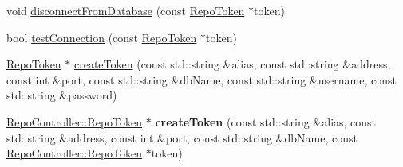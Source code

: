 \begin{DoxyCompactItemize}
\item 
void \hyperlink{class_repo_controller_1_1___repo_controller_impl_aa0570180571cc2817f8e2532109241cc}{disconnect\+From\+Database} (const \hyperlink{class_repo_controller_1_1_repo_token}{Repo\+Token} $\ast$token)
\item 
bool \hyperlink{class_repo_controller_1_1___repo_controller_impl_a9059a32af25fa8208df178134d6a67b5}{test\+Connection} (const \hyperlink{class_repo_controller_1_1_repo_token}{Repo\+Token} $\ast$token)
\item 
\hyperlink{class_repo_controller_1_1_repo_token}{Repo\+Token} $\ast$ \hyperlink{class_repo_controller_1_1___repo_controller_impl_a19680de90765086cb585affd15c084ee}{create\+Token} (const std\+::string \&alias, const std\+::string \&address, const int \&port, const std\+::string \&db\+Name, const std\+::string \&username, const std\+::string \&password)
\item 
\hypertarget{class_repo_controller_1_1___repo_controller_impl_a4b95f6b09a6375fae2f5511c06593b51}{}\hyperlink{class_repo_controller_1_1_repo_token}{Repo\+Controller\+::\+Repo\+Token} $\ast$ {\bfseries create\+Token} (const std\+::string \&alias, const std\+::string \&address, const int \&port, const std\+::string \&db\+Name, const \hyperlink{class_repo_controller_1_1_repo_token}{Repo\+Controller\+::\+Repo\+Token} $\ast$token)\label{class_repo_controller_1_1___repo_controller_impl_a4b95f6b09a6375fae2f5511c06593b51}


\end{DoxyCompactItemize}
